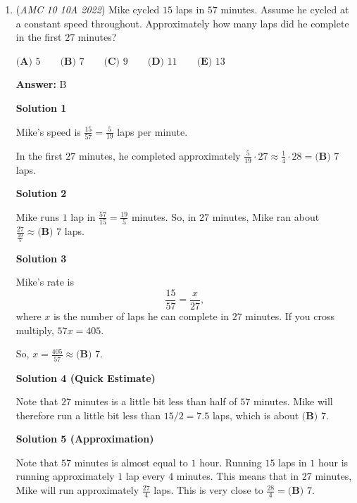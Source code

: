 \begin{enumerate}
 (Note: Integer solutions increase exponentially, so our next solution will have a numerator greater than $3^2(109)$. Therefore, when you don't see numerators greater than $3^2(109)$ in the answer choices, this method should be fine.)

 


	\item (\textit{AMC 10 10A 2022}) Mike cycled $15$ laps in $57$ minutes. Assume he cycled at a constant speed throughout. Approximately how many laps did he complete in the first $27$ minutes?


 $\textbf{(A) } 5 \qquad\textbf{(B) } 7 \qquad\textbf{(C) } 9 \qquad\textbf{(D) } 11 \qquad\textbf{(E) } 13$

 \textbf{Answer: }B



\textbf{Solution 1}

Mike's speed is $\frac{15}{57}=\frac{5}{19}$ laps per minute.

 In the first $27$ minutes, he completed approximately $\frac{5}{19}\cdot27\approx\frac{1}{4}\cdot28=\boxed{\textbf{(B) } 7}$ laps.

 



\textbf{Solution 2}

Mike runs $1$ lap in $\frac{57}{15}=\frac{19}{5}$ minutes. So, in $27$ minutes, Mike ran about $\frac{27}{\frac{19}{5}} \approx \boxed{\textbf{(B) }7}$ laps.

 



\textbf{Solution 3}

Mike's rate is 
 \[\frac{15}{57}=\frac{x}{27},\] where $x$ is the number of laps he can complete in $27$ minutes. If you cross multiply, $57x = 405$. 

 So, $x = \frac{405}{57} \approx \boxed{\textbf{(B) }7}$. 

 



\textbf{Solution 4 (Quick Estimate)}

Note that $27$ minutes is a little bit less than half of $57$ minutes. Mike will therefore run a little bit less than $15/2=7.5$ laps, which is about $\boxed{\textbf{(B) }7}$. 

 



\textbf{Solution 5 (Approximation)}

Note that $57$ minutes is almost equal to $1$ hour. Running $15$ laps in $1$ hour is running approximately $1$ lap every $4$ minutes. This means that in $27$ minutes, Mike will run approximately $\frac{27}{4}$ laps. This is very close to $\frac{28}{4} = \boxed{\textbf{(B) }7}$.


\end{enumerate}
